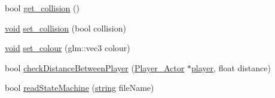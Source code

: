\begin{DoxyCompactItemize}
bool \hyperlink{classNPC__Actor_a0957033379358fcfb66b07307f25c32e}{get\+\_\+collision} ()
\item 
\hyperlink{imgui__impl__opengl3__loader_8h_ac668e7cffd9e2e9cfee428b9b2f34fa7}{void} \hyperlink{classNPC__Actor_a7c380c28c883a0823d772f2b91934185}{set\+\_\+collision} (bool collision)
\item 
\hyperlink{imgui__impl__opengl3__loader_8h_ac668e7cffd9e2e9cfee428b9b2f34fa7}{void} \hyperlink{classNPC__Actor_aaf0be3c75aa294c15f999c2398412d5e}{set\+\_\+colour} (glm\+::vec3 colour)
\item 
bool \hyperlink{classNPC__Actor_a16c0a2ec5add05145d0065493cb5edd6}{check\+Distance\+Between\+Player} (\hyperlink{classPlayer__Actor}{Player\+\_\+\+Actor} $\ast$\hyperlink{game__play__state_8cpp_ac65a4bc85dcd7c1cefbc84425f42fc46}{player}, float distance)
\item 
bool \hyperlink{classNPC__Actor_a3a5bc6ab5362520a4d919ca99b31f51b}{read\+State\+Machine} (\hyperlink{imgui__impl__opengl3__loader_8h_ac83513893df92266f79a515488701770}{string} file\+Name)
\end{DoxyCompactItemize}
